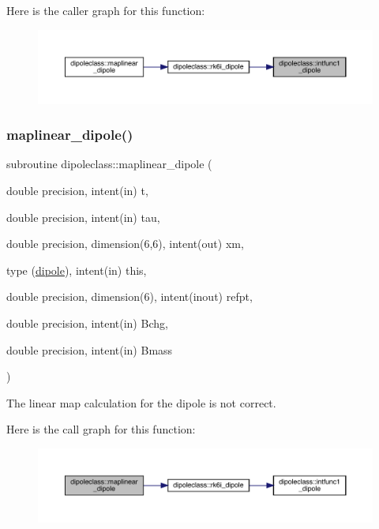 Here is the caller graph for this function\+:\nopagebreak
\begin{figure}[H]
\begin{center}
\leavevmode
\includegraphics[width=350pt]{namespacedipoleclass_ab15f3a0defc0de419f5613659abc9cad_icgraph}
\end{center}
\end{figure}
\mbox{\label{namespacedipoleclass_a3388afe517788e8b824b96bf49793510}} 
\subsubsection{\texorpdfstring{maplinear\_dipole()}{maplinear\_dipole()}}
{\footnotesize\ttfamily subroutine dipoleclass\+::maplinear\+\_\+dipole (\begin{DoxyParamCaption}\item[{double precision, intent(in)}]{t,  }\item[{double precision, intent(in)}]{tau,  }\item[{double precision, dimension(6,6), intent(out)}]{xm,  }\item[{type (\mbox{\hyperlink{namespacedipoleclass_structdipoleclass_1_1dipole}{dipole}}), intent(in)}]{this,  }\item[{double precision, dimension(6), intent(inout)}]{refpt,  }\item[{double precision, intent(in)}]{Bchg,  }\item[{double precision, intent(in)}]{Bmass }\end{DoxyParamCaption})}



The linear map calculation for the dipole is not correct. 

Here is the call graph for this function\+:\nopagebreak
\begin{figure}[H]
\begin{center}
\leavevmode
\includegraphics[width=350pt]{namespacedipoleclass_a3388afe517788e8b824b96bf49793510_cgraph}
\end{center}
\end{figure}
\mbox{\label{namespacedipoleclass_a1a92cd51d6ad864d251dd3abdc361ba8}} 
